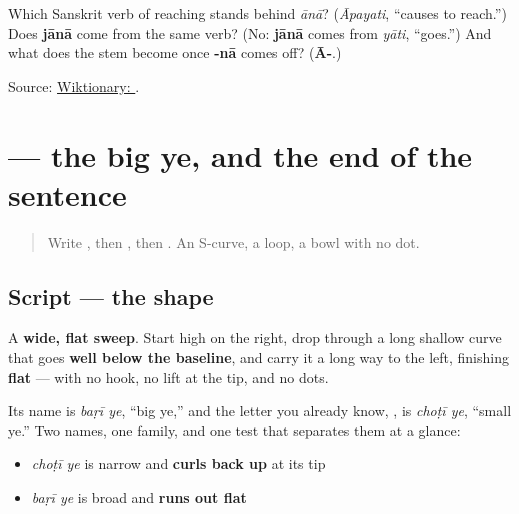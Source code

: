\begin{tcolorbox}[breakable,colback=teal!4,colframe=teal!35!black,title={Before you move on}]
Which Sanskrit verb of reaching stands behind \emph{ānā}? (\emph{Āpayati}, “causes to reach.”) Does \textbf{jānā} come from the same verb? (No: \textbf{jānā} comes from \emph{yāti}, “goes.”) And what does the stem become once \textbf{-nā} comes off? (\textbf{Ā-}.)

Source: \href{https://en.wiktionary.org/wiki/\%D8\%A2\%D9\%86\%D8\%A7\#Urdu}{Wiktionary: }.
\end{tcolorbox}
\section[\texorpdfstring{\ur{ے} (baṛī ye)}{ے (baṛī ye)}]{ — the big ye, and the end of the sentence}

\label{lesson:UR-W06-bari-ye}



\begin{quote}
Write , then , then . An S-curve, a loop, a bowl with no dot.
\end{quote}

\subsection*{Script — the shape}

\begin{quote}
\end{quote}

A \textbf{wide, flat sweep}. Start high on the right, drop through a long shallow curve that goes \textbf{well below the baseline}, and carry it a long way to the left, finishing \textbf{flat} — with no hook, no lift at the tip, and no dots.

Its name is \textbf{} \emph{baṛī ye}, \textquotedblleft{}big ye,\textquotedblright{} and the letter you already know, \textbf{}, is \emph{choṭī ye}, \textquotedblleft{}small ye.\textquotedblright{} Two names, one family, and one test that separates them at a glance:

\begin{itemize}
\raggedright
  \item \textbf{} \emph{choṭī ye} is narrow and \textbf{curls back up} at its tip
  \item \textbf{} \emph{baṛī ye} is broad and \textbf{runs out flat}
\end{itemize}

